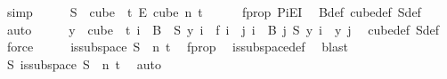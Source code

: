 \begin{isabellebody}
\ simp\isanewline
\ \ \isamarkupfalse%
\ \isamarkupfalse%
\ {\isachardoublequoteopen}S\ {\isasymin}\ {\isacharparenleft}{\kern0pt}cube\ {}\ t{\isacharparenright}{\kern0pt}\ {\isasymrightarrow}\isactrlsub E\ {\isacharparenleft}{\kern0pt}cube\ n\ t{\isacharparenright}{\kern0pt}{\isachardoublequoteclose}\isanewline
\ \ \ \ \isamarkupfalse%
\ f{\isacharunderscore}{\kern0pt}prop\ PiE{\isacharunderscore}{\kern0pt}I\ \isamarkupfalse%
\ B{\isacharunderscore}{\kern0pt}def\ cube{\isacharunderscore}{\kern0pt}def\ S{\isacharunderscore}{\kern0pt}def\ \isamarkupfalse%
\ auto\isanewline
\ \ \isamarkupfalse%
\ \isamarkupfalse%
\ {\isachardoublequoteopen}{\isacharparenleft}{\kern0pt}{\isasymforall}y\ {\isasymin}\ cube\ {}\ t{\isachardot}{\kern0pt}\ {\isacharparenleft}{\kern0pt}{\isasymforall}i\ {\isasymin}\ B\ {}{\isachardot}{\kern0pt}\ S\ y\ i\ {\isacharequal}{\kern0pt}\ f\ i{\isacharparenright}{\kern0pt}\ {\isasymand}\ {\isacharparenleft}{\kern0pt}{\isasymforall}j{\isacharless}{\kern0pt}{}{\isachardot}{\kern0pt}\ {\isasymforall}i\ {\isasymin}\ B\ j{\isachardot}{\kern0pt}\ {\isacharparenleft}{\kern0pt}S\ y{\isacharparenright}{\kern0pt}\ i\ {\isacharequal}{\kern0pt}\ y\ j{\isacharparenright}{\kern0pt}{\isacharparenright}{\kern0pt}{\isachardoublequoteclose}\ \isamarkupfalse%
\ cube{\isacharunderscore}{\kern0pt}def\ S{\isacharunderscore}{\kern0pt}def\ \isamarkupfalse%
\ force\isanewline
\ \ \isamarkupfalse%
\ \isamarkupfalse%
\ {\isachardoublequoteopen}is{\isacharunderscore}{\kern0pt}subspace\ S\ {}\ n\ t{\isachardoublequoteclose}\ \isamarkupfalse%
\ f{\isacharunderscore}{\kern0pt}prop\ \isamarkupfalse%
\ is{\isacharunderscore}{\kern0pt}subspace{\isacharunderscore}{\kern0pt}def\ \isamarkupfalse%
\ blast\isanewline
\ \ \isamarkupfalse%
\ \isamarkupfalse%
\ {\isachardoublequoteopen}{\isasymexists}S{\isachardot}{\kern0pt}\ is{\isacharunderscore}{\kern0pt}subspace\ S\ {}\ n\ t{\isachardoublequoteclose}\ \isamarkupfalse%
\ auto\isanewline
{}\isamarkupfalse%
%
\endisatagproof
{\isafoldproof}%
%
\isadelimproof
%
\endisadelimproof
%
\isadelimdocument
%
\endisadelimdocument
%
\isatagdocument
%
\isamarkuptrue%
%
\endisatagdocument
{\isafolddocument}%

\end{isabellebody}
